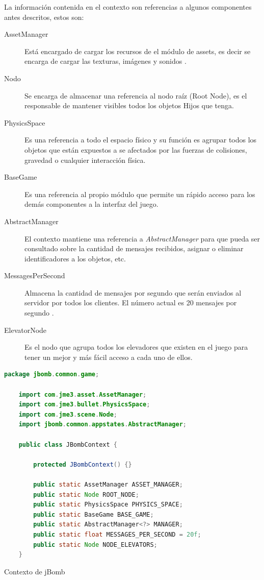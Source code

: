 \documentclass[a4paper,12pt,openany,oneside]{book}
\begin{document}
La información contenida en el contexto son referencias a algunos componentes antes descritos, estos son:
\begin{description}
\item[AssetManager] Está encargado de cargar los recursos de el módulo de assets, es decir se encarga de cargar las texturas, imágenes y sonidos \cite{BEGINNERS}.
\item[Nodo] Se encarga de almacenar una referencia al nodo raíz (Root Node), es el responsable de mantener visibles todos los objetos Hijos que tenga.
\item[PhysicsSpace] Es una referencia a todo el espacio físico y su función es agrupar todos los objetos que están expuestos a se afectados por las fuerzas de colisiones, gravedad o cualquier interacción física.
\item[BaseGame] Es una referencia al propio módulo que permite un rápido acceso para los demás componentes a la interfaz del juego.
\item[AbstractManager] El contexto mantiene una referencia a \textit{AbstractManager} para que pueda ser consultado sobre la cantidad de mensajes recibidos, asignar o eliminar identificadores a los objetos, etc.
\item[MessagesPerSecond] Almacena la cantidad de mensajes por segundo que serán enviados al servidor por todos los clientes. El número actual es 20 mensajes por segundo \cite{VALVE1}.
\item[ElevatorNode] Es el nodo que agrupa todos los elevadores que existen en el juego para tener un mejor y más fácil acceso a cada uno de ellos.
\newpage
\end{description}
\begin{codigo}
\begin{lstlisting}[language=Java,frame=single,basicstyle=\scriptsize]
	package jbomb.common.game;

	import com.jme3.asset.AssetManager;
	import com.jme3.bullet.PhysicsSpace;
	import com.jme3.scene.Node;
	import jbomb.common.appstates.AbstractManager;
	
	public class JBombContext {
	
	    protected JBombContext() {}
	
	    public static AssetManager ASSET_MANAGER;
	    public static Node ROOT_NODE;
	    public static PhysicsSpace PHYSICS_SPACE;
	    public static BaseGame BASE_GAME;
	    public static AbstractManager<?> MANAGER;
	    public static float MESSAGES_PER_SECOND = 20f;
	    public static Node NODE_ELEVATORS;
	}
\end{lstlisting}
\caption{Contexto de jBomb}
\label{lst8}
\end{codigo}
\end{document}
